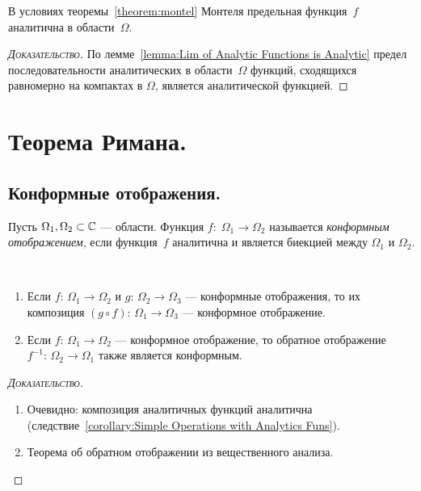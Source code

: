 \documentclass[../complex-analysis.tex]{subfiles}
\begin{document}
\begin{remrk}
 В условиях теоремы~\ref{theorem:montel} Монтеля предельная функция~$ f $ аналитична в области~$ \Omega $.
\end{remrk}
\begin{proof}[\normalfont\textsc{Доказательство}]
 По лемме~\ref{lemma:Lim of Analytic Functions is Analytic} предел последовательности аналитических в области~$ \Omega $ функций, сходящихся равномерно на компактах в $ \Omega $, является аналитической функцией.
\end{proof}

\newpage
\section{Теорема Римана.}

\subsection{Конформные отображения.}

\begin{df}
 Пусть $ \Omega_1, \Omega_2 \subset \mathbb{C} $ --- области. Функция $ f \colon\; \Omega_1 \to \Omega_2 $ называется \emph{конформным отображением}, если функция~$ f $ аналитична и является биекцией между $ \Omega_1 $  и $ \Omega_2 $.
\end{df}

\begin{prop}\
 \label{proposition:conformal_map_group_properties}
 \begin{enumerate}
  \item Если $ f\colon\,\Omega_1 \to \Omega_2 $ и $ g\colon\,\Omega_2\to\Omega_3 $ --- конформные отображения, то их композиция $ (g \circ f) \colon\,\Omega_1 \to \Omega_3 $ --- конформное отображение.
  \item Если $ f \colon\,\Omega_1 \to \Omega_2 $ --- конформное отображение, то обратное отображение $ f^{-1}\colon\,\Omega_2\to\Omega_1 $ также является конформным.
 \end{enumerate}
\end{prop}
\begin{proof}[\normalfont\textsc{Доказательство}]\
 \begin{enumerate}
  \item Очевидно: композиция аналитичных функций аналитична (следствие~\ref{corollary:Simple Operations with Analytics Funs}).
  \item Теорема об обратном отображении из вещественного анализа.
 \end{enumerate}
\end{proof}
\end{document}
